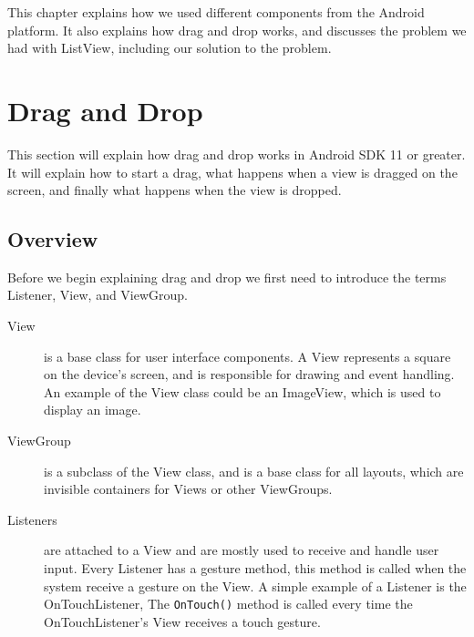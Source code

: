 This chapter explains how we used different components from the Android platform. It also explains how drag and drop works, and discusses the problem we had with ListView, including our solution to the problem.
\section{Drag and Drop}
\label{sec:androiddraganddrop}
This section will explain how drag and drop works in Android SDK 11 or greater\citep{androiddraganddropguide}. It will explain how to start a drag, what happens when a view is dragged on the screen, and finally what happens when the view is dropped.

\subsection*{Overview}

Before we begin explaining drag and drop we first need to introduce the terms Listener, View, and ViewGroup.
\begin{description}
\item[View] is a base class for user interface components. A View represents a square on the device's screen, and is responsible for drawing and event handling. An example of the View class could be an ImageView, which is used to display an image.

\item[ViewGroup] is a subclass of the View class, and is a base class for all layouts, which are invisible containers for Views or other ViewGroups.

\item[Listeners] are attached to a View and are mostly used to receive and handle user input. Every Listener has a gesture method, this method is called when the system receive a gesture on the View. A simple example of a Listener is the OnTouchListener, The \lstinline|OnTouch()| method is called every time the OnTouchListener's View receives a touch gesture.
\end{description}

